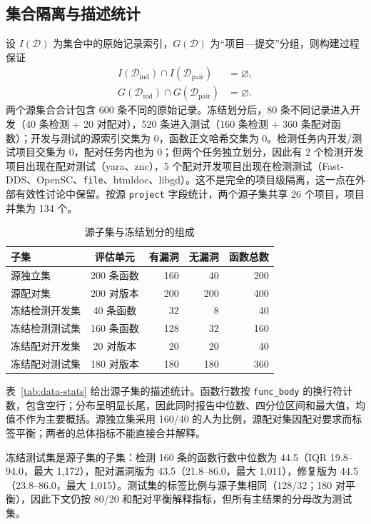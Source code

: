 \documentclass[conference]{IEEEtran}
\newcommand{\Dind}{\mathcal{D}_{\mathrm{ind}}}
\newcommand{\Dpair}{\mathcal{D}_{\mathrm{pair}}}
\begin{document}
\subsection{集合隔离与描述统计}
设 $I(\mathcal{D})$ 为集合中的原始记录索引，$G(\mathcal{D})$ 为“项目—提交”分组，则构建过程保证
\begin{align}
I(\Dind)\cap I(\Dpair)&=\varnothing,\\
G(\Dind)\cap G(\Dpair)&=\varnothing.
\end{align}
两个源集合合计包含 600 条不同的原始记录。冻结划分后，80 条不同记录进入开发（40 条检测 + 20 对配对），520 条进入测试（160 条检测 + 360 条配对函数）；开发与测试的源索引交集为 0，函数正文哈希交集为 0。检测任务内开发/测试项目交集为 0，配对任务内也为 0；但两个任务独立划分，因此有 2 个检测开发项目出现在配对测试（yara、znc），5 个配对开发项目出现在检测测试（Fast-DDS、OpenSC、\texttt{file}、htmldoc、libgd）。这不是完全的项目级隔离，这一点在外部有效性讨论中保留。按源 \texttt{project} 字段统计，两个源子集共享 26 个项目，项目并集为 134 个。

\begin{table}[t]
\caption{源子集与冻结划分的组成}
\label{tab:data-composition}
\centering
\small
\begin{tabular}{@{}lcrrr@{}}
\toprule
子集 & 评估单元 & 有漏洞 & 无漏洞 & 函数总数\\
\midrule
源独立集 & 200 条函数 & 160 & 40 & 200\\
源配对集 & 200 对版本 & 200 & 200 & 400\\
冻结检测开发集 & 40 条函数 & 32 & 8 & 40\\
冻结检测测试集 & 160 条函数 & 128 & 32 & 160\\
冻结配对开发集 & 20 对版本 & 20 & 20 & 40\\
冻结配对测试集 & 180 对版本 & 180 & 180 & 360\\
\bottomrule
\end{tabular}
\end{table}

表~\ref{tab:data-stats} 给出源子集的描述统计。函数行数按 \texttt{func\_body} 的换行符计数，包含空行；分布呈明显长尾，因此同时报告中位数、四分位区间和最大值，均值不作为主要概括。源独立集采用 160/40 的人为比例，源配对集因配对要求而标签平衡；两者的总体指标不能直接合并解释。

冻结测试集是源子集的子集：检测 160 条的函数行数中位数为 44.5（IQR 19.8--94.0，最大 1{,}172），配对漏洞版为 43.5（21.8--86.0，最大 1{,}011），修复版为 44.5（23.8--86.0，最大 1{,}015）。测试集的标签比例与源子集相同（128/32；180 对平衡），因此下文仍按 80/20 和配对平衡解释指标，但所有主结果的分母改为测试集。
\end{document}
